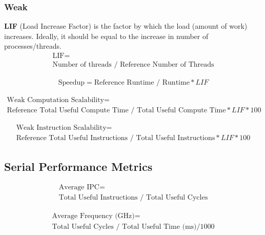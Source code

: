 \documentclass[article,12pt]{memoir}
\begin{document}
	\subsubsection{Weak}
	\textbf{LIF} (Load Increase Factor) is the factor by which the load (amount of work) increases. Ideally, it should be equal to the increase in number of processes/threads.
	\begin{equation}\label{lif}
		\begin{gathered}
			\text{LIF} =\\
			\text{Number of threads } / \text{ Reference Number of Threads}
		\end{gathered}
	\end{equation}
	
	\begin{equation}\label{strongspeedup}
		\begin{gathered}
			\text{Speedup} =
			\text{Reference Runtime } / \text{ Runtime} * LIF
		\end{gathered}
	\end{equation}
	
	\begin{equation}\label{weakcompscala}
		\begin{gathered}
			\text{Weak Computation Scalability} =\\
			\text{Reference Total Useful Compute Time } / \text{ Total Useful Compute Time} * LIF * 100
		\end{gathered}
	\end{equation}
	
	\begin{equation}\label{weakinscala}
		\begin{gathered}
			\text{Weak Instruction Scalability} =\\
			\text{Reference Total Useful Instructions } / \text{ Total Useful Instructions} * LIF * 100
		\end{gathered}
	\end{equation}
	
	\subsection{Serial Performance Metrics}
	
	\begin{equation}\label{avipc}
		\begin{gathered}
			\text{Average IPC} =\\
			\text{Total Useful Instructions } / \text{ Total Useful Cycles}
		\end{gathered}
	\end{equation}
	
	\begin{equation}\label{avipc}
		\begin{gathered}
			\text{Average Frequency (GHz)} =\\
			\text{Total Useful Cycles } / \text{ Total Useful Time (ms)} / 1000
		\end{gathered}
	\end{equation}
	
\end{document}
